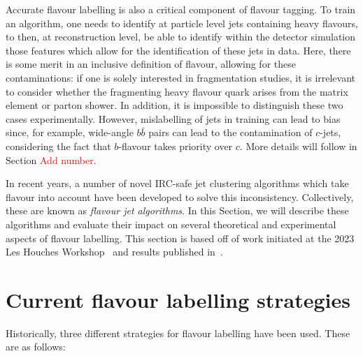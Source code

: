 \documentclass[10pt,a4paper]{book}
\begin{document}
Accurate flavour labelling is also a critical component of flavour tagging. To train an algorithm, one needs to identify at particle level jets containing heavy flavours, to then, at reconstruction level, be able to identify within the detector simulation those features which allow for the identification of these jets in data. Here, there is some merit in an inclusive definition of flavour, allowing for these contaminations: if one is solely interested in fragmentation studies, it is irrelevant to consider whether the fragmenting heavy flavour quark arises from the matrix element or parton shower. In addition, it is impossible to distinguish these two cases experimentally. However, mislabelling of jets in training can lead to bias since, for example, wide-angle $b\bar{b}$ pairs can lead to the contamination of $c$-jets, considering the fact that $b$-flavour takes priority over $c$. More details will follow in Section \textcolor{red}{Add number}.

In recent years, a number of novel IRC-safe jet clustering algorithms which take flavour into account have been developed to solve this inconsistency. Collectively, these are known as \emph{flavour jet algorithms}. In this Section, we will describe these algorithms and evaluate their impact on several theoretical and experimental aspects of flavour labelling. This section is based off of work initiated at the 2023 Les Houches Workshop~\cite{Huss:2929863} and results published in~\cite{Behring:2025ilo}. 

\section{Current flavour labelling strategies}

Historically, three different strategies for flavour labelling have been used. These are as follows:
\end{document}
